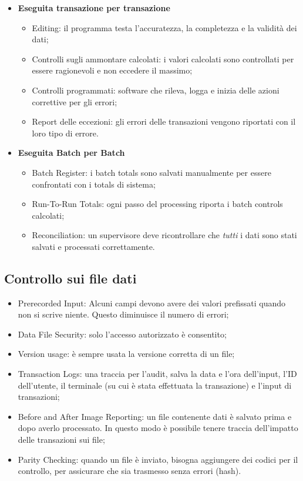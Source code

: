 \begin{itemize}
\item \textbf{Eseguita transazione per transazione}
\begin{itemize}
\item Editing: il programma testa l'accuratezza, la completezza
e la validità dei dati;
\item Controlli sugli ammontare calcolati: i valori calcolati
sono controllati per essere ragionevoli e non eccedere il massimo;
\item Controlli programmati: software che rileva, logga e inizia
delle azioni correttive per gli errori;
\item Report delle eccezioni: gli errori delle transazioni vengono
riportati con il loro tipo di errore.
\end{itemize}

\item \textbf{Eseguita Batch per Batch}

\begin{itemize}
\item Batch Register: i batch totals sono salvati manualmente per essere
confrontati con i totals di sistema;
\item Run-To-Run Totals: ogni passo del processing riporta i batch
controls calcolati;
\item Reconciliation: un supervisore deve ricontrollare che \emph{tutti}
i dati sono stati salvati e processati correttamente.
\end{itemize}
\end{itemize}


\subsection{Controllo sui file dati}
\begin{itemize}
\item Prerecorded Input: Alcuni campi devono avere dei valori prefissati
quando non si scrive niente. Questo diminuisce il numero di errori;

\item Data File Security: solo l'accesso autorizzato è consentito;
\item Version usage: è sempre usata la versione corretta di un file;
\item Transaction Logs: una traccia per l'audit, salva la data e l'ora
dell'input, l'ID dell'utente, il terminale (su cui è stata effettuata la
transazione) e l'input di transazioni;
\item Before and After Image Reporting: un file contenente dati è salvato
prima e dopo averlo processato. In questo modo è possibile tenere traccia
dell'impatto delle transazioni sui file;
\item Parity Checking: quando un file è inviato, bisogna aggiungere dei codici
per il controllo, per assicurare che sia trasmesso senza errori (hash).
\end{itemize}

